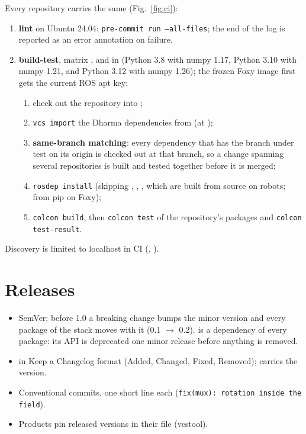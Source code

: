 Every repository carries the same  (Fig.~\ref{fig:ci}):
\begin{enumerate}
  \item \textbf{lint} on Ubuntu 24.04: \texttt{pre-commit run --all-files}; the end of the log is
    reported as an error annotation on failure.
  \item \textbf{build-test}, matrix ,  and  in
     (Python 3.8 with numpy 1.17, Python 3.10 with numpy 1.21, and
    Python 3.12 with numpy 1.26); the frozen Foxy image first gets the current ROS apt key:
    \begin{enumerate}
      \item check out the repository into ;
      \item \texttt{vcs import} the Dharma dependencies from  (at );
      \item \textbf{same-branch matching}: every dependency that has the branch under test on
        its origin is checked out at that branch, so a change spanning several repositories is
        built and tested together before it is merged;
      \item \texttt{rosdep install} (skipping , ,
        , which are built from source on robots;  from pip on Foxy);
      \item \texttt{colcon build}, then \texttt{colcon test} of the repository's packages and
        \texttt{colcon test-result}.
    \end{enumerate}
\end{enumerate}
Discovery is limited to localhost in CI (, ).

\section{Releases}

\begin{itemize}
  \item SemVer; before 1.0 a breaking change bumps the minor version and every package of the stack
    moves with it (0.1 $\to$ 0.2).  is a dependency of every package: its API is
    deprecated one minor release before anything is removed.
  \item {} in Keep a Changelog format (Added, Changed, Fixed, Removed);
     carries the version.
  \item Conventional commits, one short line each (\texttt{fix(mux): rotation inside the field}).
  \item Products pin released versions in their  file (vcstool).
\end{itemize}

